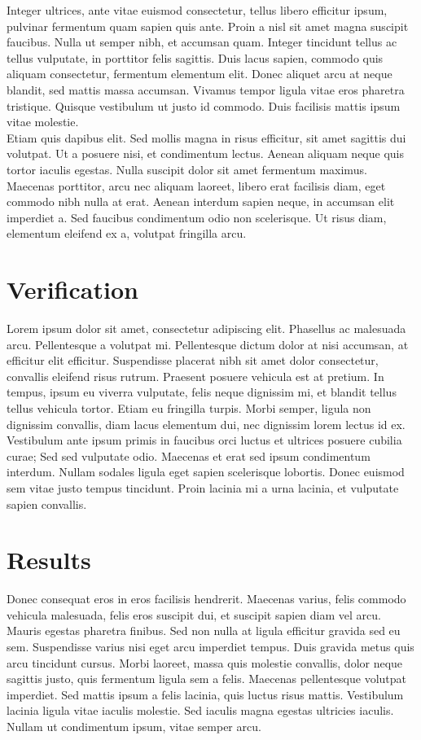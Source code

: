 \documentclass[a4paper, 11pt] {article}
\begin{document}
 Integer ultrices, ante vitae euismod consectetur, tellus libero efficitur ipsum, pulvinar fermentum quam sapien quis ante. Proin a nisl sit amet magna suscipit faucibus. Nulla ut semper nibh, et accumsan quam. Integer tincidunt tellus ac tellus vulputate, in porttitor felis sagittis. Duis lacus sapien, commodo quis aliquam consectetur, fermentum elementum elit. Donec aliquet arcu at neque blandit, sed mattis massa accumsan. Vivamus tempor ligula vitae eros pharetra tristique. Quisque vestibulum ut justo id commodo. Duis facilisis mattis ipsum vitae molestie.
\\
Etiam quis dapibus elit. Sed mollis magna in risus efficitur, sit amet sagittis dui volutpat. Ut a posuere nisi, et condimentum lectus. Aenean aliquam neque quis tortor iaculis egestas. Nulla suscipit dolor sit amet fermentum maximus. Maecenas porttitor, arcu nec aliquam laoreet, libero erat facilisis diam, eget commodo nibh nulla at erat. Aenean interdum sapien neque, in accumsan elit imperdiet a. Sed faucibus condimentum odio non scelerisque. Ut risus diam, elementum eleifend ex a, volutpat fringilla arcu. 


\section{Verification}

Lorem ipsum dolor sit amet, consectetur adipiscing elit. Phasellus ac malesuada arcu. Pellentesque a volutpat mi. Pellentesque dictum dolor at nisi accumsan, at efficitur elit efficitur. Suspendisse placerat nibh sit amet dolor consectetur, convallis eleifend risus rutrum. Praesent posuere vehicula est at pretium. In tempus, ipsum eu viverra vulputate, felis neque dignissim mi, et blandit tellus tellus vehicula tortor. Etiam eu fringilla turpis. Morbi semper, ligula non dignissim convallis, diam lacus elementum dui, nec dignissim lorem lectus id ex. Vestibulum ante ipsum primis in faucibus orci luctus et ultrices posuere cubilia curae; Sed sed vulputate odio. Maecenas et erat sed ipsum condimentum interdum. Nullam sodales ligula eget sapien scelerisque lobortis. Donec euismod sem vitae justo tempus tincidunt. Proin lacinia mi a urna lacinia, et vulputate sapien convallis. 



\section{Results}


Donec consequat eros in eros facilisis hendrerit. Maecenas varius, felis commodo vehicula malesuada, felis eros suscipit dui, et suscipit sapien diam vel arcu. Mauris egestas pharetra finibus. Sed non nulla at ligula efficitur gravida sed eu sem. Suspendisse varius nisi eget arcu imperdiet tempus. Duis gravida metus quis arcu tincidunt cursus. Morbi laoreet, massa quis molestie convallis, dolor neque sagittis justo, quis fermentum ligula sem a felis. Maecenas pellentesque volutpat imperdiet. Sed mattis ipsum a felis lacinia, quis luctus risus mattis. Vestibulum lacinia ligula vitae iaculis molestie. Sed iaculis magna egestas ultricies iaculis. Nullam ut condimentum ipsum, vitae semper arcu. 
\end{document}
